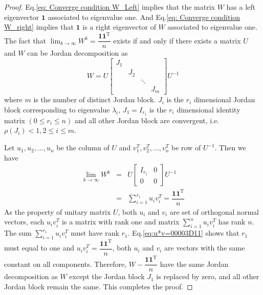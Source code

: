 \begin{proof}
Eq.\ref{eq: Converge condition W_Left} implies that the matrix $W$
has a left eigenvector $\mathbf{1}$ associated to eigenvalue one.
And Eq.\ref{eq: Converge condition W_right} implies that $\mathbf{1}$
is a right eigenvector of $W$ associated to eigenvalue one.
The fact that $\lim_{k\rightarrow\infty}W^{k}=\dfrac{\mathbf{11}^{\mathrm{T}}}{n}$
exists if and only if there exists a  matrix $U$ and $W$
can be Jordan decomposition as 
\begin{equation}
W=U\left[\begin{array}{cccc}
J_{1}\\
 & J_{2}\\
 &  & \ddots\\
 &  &  & J_{m}
\end{array}\right]U^{-1}
\end{equation}
where $m$ is the number of distinct Jordan block. $J_{i}$ is the
$r_{i}$ dimensional Jordan block corresponding to eigenvalue $\lambda_{i}$,
$J_{1}=I_{r_{1}}$ is the $r_{i}$ dimensional identity matrix $\left(0\leq r_{i}\leq n\right)$
and all other Jordan block are convergent, i.e. $\rho\left(J_{i}\right)<1,2\leq i\leq m$.

Let $u_{1},u_{2},\ldots,u_{n}$ be the column of $U$ and $v_{1}^{T},v_{2}^{T},\ldots,v_{n}^{T}$
be row of $U^{-1}$. Then we have 
\begin{eqnarray}
\lim_{k\to\infty}W^{k} & = & U\left[\begin{array}{cc}
I_{r_{1}} & 0\\
0 & 0
\end{array}\right]U^{-1}\label{eq: W^k to infinity has Rank one}\\
 & = & \sum_{i=1}^{r_{1}}u_{i}v_{i}^{T}=\dfrac{\mathbf{11}^{\mathrm{T}}}{n}\label{eq:u*v=00003D11}
\end{eqnarray}
As the property of unitary matrix $U$, both $u_{i}$ and $v_{i}$
are set of orthogonal normal vectors, each $u_{i}v_{i}^{T}$ is a
matrix with rank one and matrix $\sum_{i=1}^{n}u_{i}v_{i}^{T}$ has
rank $n$. The sum $\sum_{i=1}^{r_{1}}u_{i}v_{i}^{T}$ must have rank
$r_{1}.$ Eq.\ref{eq:u*v=00003D11} shows that $r_{1}$ must equal
to one and $u_{i}v_{i}^{T}=\dfrac{\mathbf{11}^{\mathrm{T}}}{n}$,
both $u_{i}$ and $v_{i}$ are vectors with the same constant on all
components. Therefore, $W-\dfrac{\mathbf{11}^{\mathrm{T}}}{n}$
have the same Jordan decomposition as $W$ except the Jordan
block $J_{1}$ is replaced by zero, and all other Jordan block remain
the same. This completes the proof. 
\end{proof}

